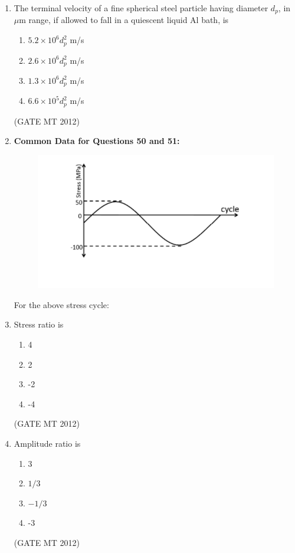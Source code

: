 \documentclass[journal, 11pt, onecolumn]{IEEEtran}
\theoremstyle{remark}
\begin{document}
\begin{enumerate}
\item The terminal velocity of a fine spherical steel particle having diameter $d_p$, in $\mu$m range, if allowed to fall in a quiescent liquid Al bath, is
\begin{multicols}{2}
\begin{enumerate}  
\item $5.2 \times 10^6 d_p^2$ m/s
\item $2.6 \times 10^6 d_p^2$ m/s
\item $1.3 \times 10^6 d_p^2$ m/s
\item $6.6 \times 10^5 d_p^2$ m/s
\end{enumerate}
\end{multicols}
\hfill(GATE MT 2012)

\item[] \textbf{Common Data for Questions 50 and 51:} 

\begin{figure}
    \centering
    \includegraphics[width=0.5\linewidth]{figs/a5f3.png}
    \caption{}
    \label{fig:placeholder}
\end{figure}

For the above stress cycle:

\item Stress ratio is
\begin{multicols}{2}
\begin{enumerate}  
\item 4
\item 2
\item -2
\item -4
\end{enumerate}
\end{multicols}
\hfill(GATE MT 2012)

\item Amplitude ratio is
\begin{multicols}{2}
\begin{enumerate}  
\item 3
\item $1/3$
\item $-1/3$
\item -3
\end{enumerate}
\end{multicols}
\hfill(GATE MT 2012)


\end{enumerate}
\end{document}
